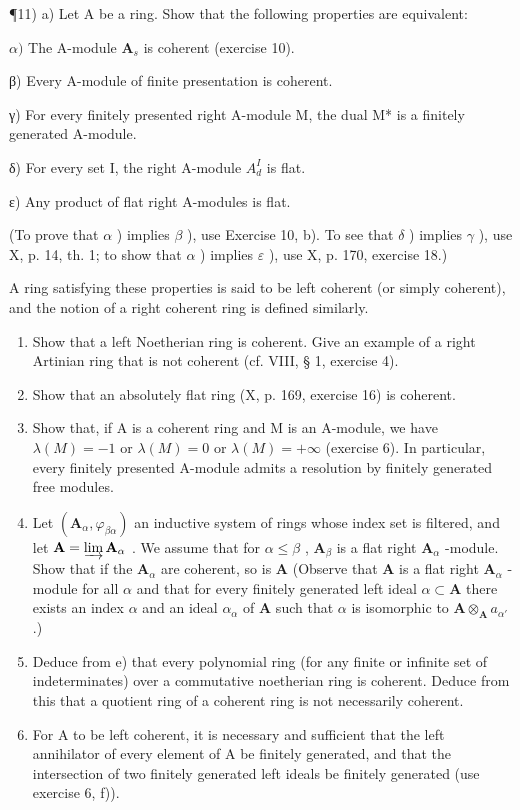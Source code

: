 ¶11) a) Let A be a ring. Show that the following properties are equivalent:

\(\alpha)\) The A-module \(\mathbf{A}_s\) is coherent (exercise 10).

β) Every A-module of finite presentation is coherent.

γ) For every finitely presented right A-module M, the dual M* is a finitely generated A-module.

δ) For every set I, the right A-module \(A_{d}^{I}\) is flat.

ε) Any product of flat right A-modules is flat.

(To prove that \(\alpha\) ) implies \(\beta\) ), use Exercise 10, b). To see that \(\delta\) ) implies \(\gamma\) ), use X, p. 14, th. 1; to show that \(\alpha\) ) implies \(\varepsilon\) ), use X, p. 170, exercise 18.)

A ring satisfying these properties is said to be left coherent (or simply coherent), and the notion of a right coherent ring is defined similarly.

\begin{enumerate}
\def\labelenumi{\alph{enumi})}
\setcounter{enumi}{1}
\item
  Show that a left Noetherian ring is coherent. Give an example of a right Artinian ring that is not coherent (cf. VIII, § 1, exercise 4).
\item
  Show that an absolutely flat ring (X, p. 169, exercise 16) is coherent.
\item
  Show that, if A is a coherent ring and M is an A-module, we have \(\lambda(M) = -1\) or \(\lambda(M) = 0\) or \(\lambda(M) = +\infty\) (exercise 6). In particular, every finitely presented A-module admits a resolution by finitely generated free modules.
\item
  Let \((\mathbf{A}_{\alpha}, \varphi_{\beta \alpha})\) an inductive system of rings whose index set is filtered, and let \(\mathbf{A} = \varinjlim \mathbf{A}_{\alpha}\) . We assume that for \(\alpha \leqslant \beta\) , \(\mathbf{A}_{\beta}\) is a flat right \(\mathbf{A}_{\alpha}\) -module. Show that if the \(\mathbf{A}_{\alpha}\) are coherent, so is \(\mathbf{A}\) (Observe that \(\mathbf{A}\) is a flat right \(\mathbf{A}_{\alpha}\) -module for all \(\alpha\) and that for every finitely generated left ideal \(\alpha \subset \mathbf{A}\) there exists an index \(\alpha\) and an ideal \(\alpha_{\alpha}\) of \(\mathbf{A}\) such that \(\alpha\) is isomorphic to \(\mathbf{A} \otimes_{\mathbf{A}} a_{\alpha'}\) .)
\item
  Deduce from e) that every polynomial ring (for any finite or infinite set of indeterminates) over a commutative noetherian ring is coherent. Deduce from this that a quotient ring of a coherent ring is not necessarily coherent.
\item
  For A to be left coherent, it is necessary and sufficient that the left annihilator of every element of A be finitely generated, and that the intersection of two finitely generated left ideals be finitely generated (use exercise 6, f)).
\end{enumerate}

